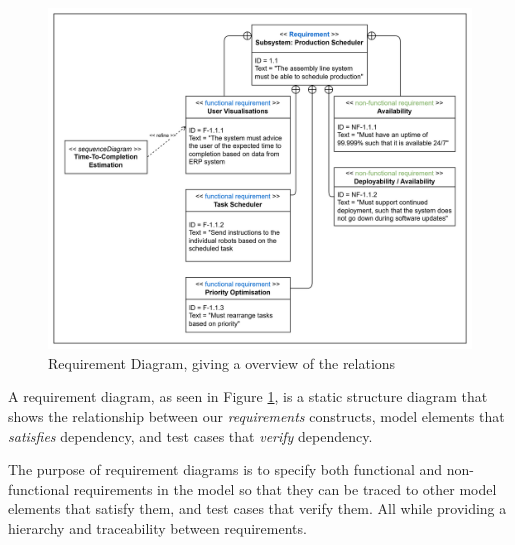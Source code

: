 \begin{figure}[hbt]
    \centering
    \caption{\centering Requirement Diagram, giving a overview of the relations}
    \label{fig:requirements-diagram}
    \includegraphics[width=0.9\linewidth]{images/requirements diagram.png}
\end{figure}

A requirement diagram, as seen in Figure \ref{fig:requirements-diagram}, is a static structure diagram that shows the relationship between our \textit{requirements} constructs, model elements that \textit{satisfies} dependency, and test cases that \textit{verify} dependency.

The purpose of requirement diagrams is to specify both functional and non-functional requirements in the model so that they can be traced to other model elements that satisfy them, and test cases that verify them. All while providing a hierarchy and traceability between requirements.

